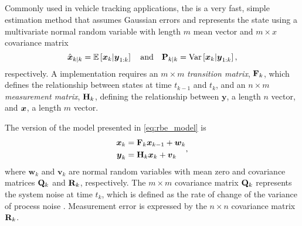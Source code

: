 \subsection{\kf{}}
\label{sec:kf}

Commonly used in vehicle tracking applications, the \kf{} is a very fast, simple estimation method \citep{Anderson_2012} that assumes Gaussian errors and represents the state using a multivariate normal random variable with length $m$ mean vector and $m\times x$ covariance matrix
\begin{equation}
\label{eq:kf_estimators}
\hat{\boldsymbol x}_{k|k} = \mathbb{E}\left[\boldsymbol x_k | \boldsymbol{y}_{1:k}\right]
\quad\text{and}\quad
\mathbf{P}_{k|k} = \mathrm{Var}\left[\boldsymbol x_k | \boldsymbol{y}_{1:k}\right],
\end{equation}
respectively. A \kf{} implementation requires an $m\times m$ \emph{transition matrix}, $\mathbf{F}_k$, which defines the relationship between states at time $t_{k-1}$ and $t_k$, and an $n\times m$ \emph{measurement matrix}, $\mathbf{H}_k$, defining the relationship between $\boldsymbol{y}$, a length $n$ vector, and $\boldsymbol x$, a length $m$ vector.


The \kf{} version of the model presented in \cref{eq:rbe_model} is
\begin{equation}
\label{eq:kf_model}
\begin{split}
\boldsymbol x_k &= \mathbf{F}_k\boldsymbol x_{k-1} + \boldsymbol{w}_k \\
\boldsymbol{y}_k &= \mathbf{H}_k\boldsymbol x_k + \boldsymbol{v}_k
\end{split},
\end{equation}
where $\boldsymbol{w}_k$ and $\boldsymbol{v}_k$ are normal random variables with mean zero and covariance matrices $\mathbf{Q}_k$ and $\mathbf{R}_k$, respectively. The $m\times m$ covariance matrix $\mathbf{Q}_k$ represents the system noise at time $t_k$, which is defined as the rate of change of the variance of process noise \citep{Cathey_2003}. Measurement error is expressed by the $n\times n$ covariance matrix $\mathbf{R}_k$.

